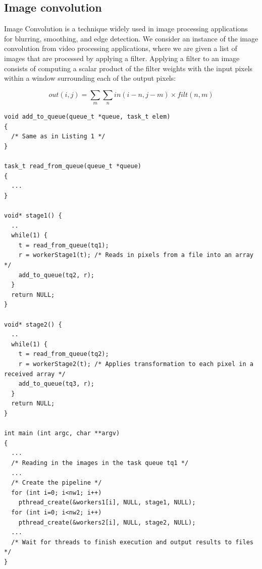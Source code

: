 \subsection{Image convolution}

Image Convolution  is a technique widely used in image processing applications for
blurring, smoothing, and edge detection. We consider an instance of the image convolution from video processing applications, where we are given a list of images that are processed by applying a filter. Applying a filter to an image consists of computing a scalar product of the filter weights with the input pixels within a window surrounding each of the output pixels:
	
\begin{equation}\label{eqn:01}
\textit{out}(i,j)=\sum_{m}\sum_{n} \textit{in}(i-n,j-m)\times \textit{filt}(n,m)
\end{equation}

\begin{lstlisting}[label=convo0, caption={Original Convolution with PThreads}]
void add_to_queue(queue_t *queue, task_t elem)
{
  /* Same as in Listing 1 */
}
  
task_t read_from_queue(queue_t *queue)
{
  ...
}

void* stage1() {
  ..
  while(1) {
    t = read_from_queue(tq1);
    r = workerStage1(t); /* Reads in pixels from a file into an array */
    add_to_queue(tq2, r);
  }
  return NULL;
}

void* stage2() {
  ..
  while(1) {
    t = read_from_queue(tq2);
    r = workerStage2(t); /* Applies transformation to each pixel in a received array */
    add_to_queue(tq3, r);
  }
  return NULL;
}

int main (int argc, char **argv)
{
  ... 
  /* Reading in the images in the task queue tq1 */
  ...
  /* Create the pipeline */
  for (int i=0; i<nw1; i++)
    pthread_create(&workers1[i], NULL, stage1, NULL);
  for (int i=0; i<nw2; i++)
    pthread_create(&workers2[i], NULL, stage2, NULL);
  ...
  /* Wait for threads to finish execution and output results to files */    
}

\end{lstlisting}

%

